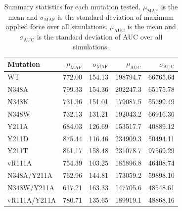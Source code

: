 \documentclass[12pt]{article}
\begin{document}
\clearpage
\begin {table}[H]
\caption{\label{tab:summary_statistics}Summary statistics for each mutation tested. $\mu_\text{MAF}$ is the mean and $\sigma_\text{MAF}$ is the standard deviation of maximum applied force over all simulations. $\mu_\text{AUC}$ is the mean and $\sigma_\text{AUC}$ is the standard deviation of AUC over all simulations.}
\begin{center}
  \resizebox{11cm}{!} {
    \begin{tabular}{l r r r r}
    \hline
      Mutation &      $\mu_\text{MAF}$ & $\sigma_\text{MAF}$ & $\mu_\text{AUC}$ & $\sigma_\text{AUC}$ \\ \hline
            WT &                772.00 &              154.13 &         198794.7 &            66765.64 \\
         N348A &                799.33 &              154.36 &         202247.3 &            65175.78 \\
         N348K &                731.36 &              151.01 &         179087.5 &            55799.49 \\
         N348W &                732.13 &              131.21 &         192043.2 &            66916.36 \\
         Y211A &                684.03 &              126.69 &         153517.7 &            40889.12 \\ 
         Y211D &                875.44 &              116.46 &         234909.3 &            50494.11 \\ 
         Y211T &                861.17 &              158.48 &         231078.7 &            97569.29 \\
        vR111A &                754.39 &              103.25 &         185896.8 &            46408.74 \\
   N348A/Y211A &                762.96 &              144.81 &         173059.2 &            59898.10 \\
   N348W/Y211A &                617.21 &              163.33 &         147705.6 &            48548.61 \\
  vR111A/Y211A &                780.71 &              135.65 &         189919.1 &            48868.16 \\
    \hline
    \end{tabular}
  }
\end{center}
\end{table}
\end{document}

